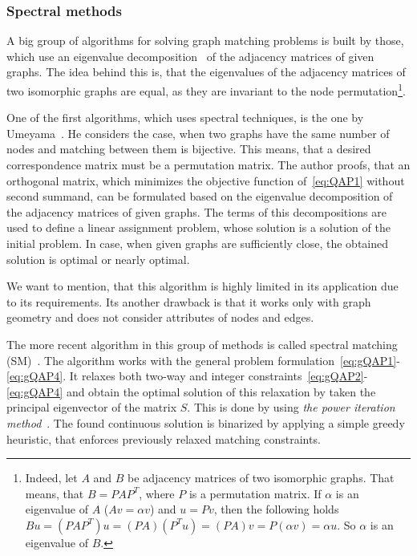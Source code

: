 \subsubsection{Spectral methods}
A big group of algorithms for solving graph matching problems is built by those, which use an eigenvalue decomposition~\cite{Book_ConvOpt} of the adjacency matrices of given graphs. The idea behind this is, that the eigenvalues of the adjacency matrices of two isomorphic graphs are equal, as they are invariant to the node permutation\footnote{Indeed, let $A$ and $B$ be adjacency matrices of two isomorphic graphs. That means, that $B=PAP^T$, where $P$ is a permutation matrix. If $\alpha$ is an eigenvalue of $A$ ($Av=\alpha v$) and $u=Pv$, then the following holds $Bu=(PAP^T)u=(PA)(P^Tu)=(PA)v=P(\alpha v)=\alpha u$. So $\alpha$ is an eigenvalue of $B$.}.

One of the first algorithms, which uses spectral techniques, is the one by Umeyama\newline~\cite{Umeyam1988}. He considers the case, when two graphs have the same number of nodes and matching between them is bijective. This means, that a desired correspondence matrix must be a permutation matrix. The author proofs, that an orthogonal matrix, which minimizes the objective function of~\eqref{eq:QAP1} without second summand, can be formulated based on the eigenvalue decomposition of the adjacency matrices of given graphs. The terms of this decompositions are used to define a linear assignment problem, whose solution is a solution of the initial problem. In case, when given graphs are sufficiently close, the obtained solution is optimal or nearly optimal.

We want to mention, that this algorithm is highly limited in its application due to its requirements. Its another drawback is that it works only with graph geometry and does not consider attributes of nodes and edges.

The more recent algorithm in this group of methods is called spectral matching (SM)~\cite{Leordeanu2005_SM}. The algorithm works with the general problem formulation~\eqref{eq:gQAP1}-\eqref{eq:gQAP4}. It relaxes both two-way and integer constraints~\eqref{eq:gQAP2}-\eqref{eq:gQAP4} and obtain the optimal solution of this relaxation by taken the principal eigenvector of the matrix $S$. This is done by using \emph{the power iteration method}~\cite{PowerIteration}. The found continuous solution is binarized by applying a simple greedy heuristic, that enforces previously relaxed matching constraints.

